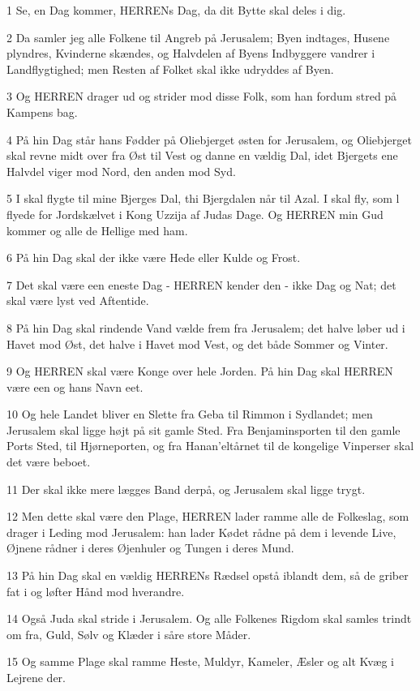 \par 1 Se, en Dag kommer, HERRENs Dag, da dit Bytte skal deles i dig.
\par 2 Da samler jeg alle Folkene til Angreb på Jerusalem; Byen indtages, Husene plyndres, Kvinderne skændes, og Halvdelen af Byens Indbyggere vandrer i Landflygtighed; men Resten af Folket skal ikke udryddes af Byen.
\par 3 Og HERREN drager ud og strider mod disse Folk, som han fordum stred på Kampens bag.
\par 4 På hin Dag står hans Fødder på Oliebjerget østen for Jerusalem, og Oliebjerget skal revne midt over fra Øst til Vest og danne en vældig Dal, idet Bjergets ene Halvdel viger mod Nord, den anden mod Syd.
\par 5 I skal flygte til mine Bjerges Dal, thi Bjergdalen når til Azal. I skal fly, som l flyede for Jordskælvet i Kong Uzzija af Judas Dage. Og HERREN min Gud kommer og alle de Hellige med ham.
\par 6 På hin Dag skal der ikke være Hede eller Kulde og Frost.
\par 7 Det skal være een eneste Dag - HERREN kender den - ikke Dag og Nat; det skal være lyst ved Aftentide.
\par 8 På hin Dag skal rindende Vand vælde frem fra Jerusalem; det halve løber ud i Havet mod Øst, det halve i Havet mod Vest, og det både Sommer og Vinter.
\par 9 Og HERREN skal være Konge over hele Jorden. På hin Dag skal HERREN være een og hans Navn eet.
\par 10 Og hele Landet bliver en Slette fra Geba til Rimmon i Sydlandet; men Jerusalem skal ligge højt på sit gamle Sted. Fra Benjaminsporten til den gamle Ports Sted, til Hjørneporten, og fra Hanan'eltårnet til de kongelige Vinperser skal det være beboet.
\par 11 Der skal ikke mere lægges Band derpå, og Jerusalem skal ligge trygt.
\par 12 Men dette skal være den Plage, HERREN lader ramme alle de Folkeslag, som drager i Leding mod Jerusalem: han lader Kødet rådne på dem i levende Live, Øjnene rådner i deres Øjenhuler og Tungen i deres Mund.
\par 13 På hin Dag skal en vældig HERRENs Rædsel opstå iblandt dem, så de griber fat i og løfter Hånd mod hverandre.
\par 14 Også Juda skal stride i Jerusalem. Og alle Folkenes Rigdom skal samles trindt om fra, Guld, Sølv og Klæder i såre store Måder.
\par 15 Og samme Plage skal ramme Heste, Muldyr, Kameler, Æsler og alt Kvæg i Lejrene der.
